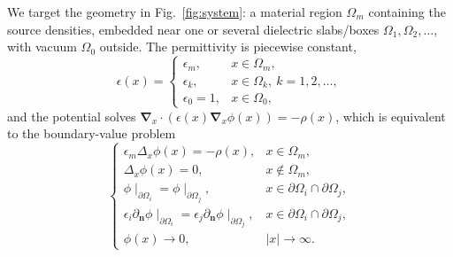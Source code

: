 \documentclass[prb,preprintnumbers,amsmath,amssymb, 10pt]{revtex4}
\newcommand{\V}[1]{\boldsymbol{#1}}
\newcommand{\M}[1]{\boldsymbol{#1}}
\newcommand{\abs}[1]{\left|#1\right|}
\newcommand{\grad}{\M{\nabla}}
\begin{document}
We target the geometry in Fig.~\ref{fig:system}: a material region
$\Omega_m$ containing the source densities, embedded near one or several
dielectric slabs/boxes $\Omega_1, \Omega_2, \dots$, with vacuum $\Omega_0$
outside.  The permittivity is piecewise constant,
\begin{equation}
    \epsilon(x) = \begin{cases}
        \epsilon_m, & x \in \Omega_m,\\
        \epsilon_k, & x \in \Omega_k,\ k=1,2,\dots,\\
        \epsilon_0 = 1, & x \in \Omega_0,
    \end{cases}
\end{equation}
and the potential solves $\grad_x \cdot (\epsilon(x) \grad_x \phi(x)) =
-\rho(x)$, which is equivalent to the boundary-value problem
\begin{equation}\label{eq:bvp}
    \begin{cases}
        \epsilon_m \Delta_x \phi(x) = -\rho(x), & x \in \Omega_m,\\
        \Delta_x \phi(x) = 0, & x \notin \Omega_m,\\
        \phi\mid_{\partial \Omega_i} = \phi\mid_{\partial \Omega_j}, &
            x \in \partial\Omega_i \cap \partial\Omega_j,\\
        \epsilon_i \partial_{\V n} \phi\mid_{\partial \Omega_i}
            = \epsilon_j \partial_{\V n} \phi\mid_{\partial \Omega_j}, &
            x \in \partial\Omega_i \cap \partial\Omega_j,\\
        \phi(x) \to 0, & \abs{x} \to \infty.
    \end{cases}
\end{equation}
\end{document}
